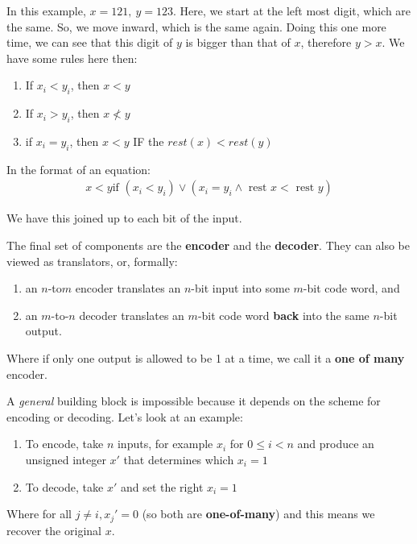 \documentclass[11pt,a4paper,titlepage,dvipsnames,cmyk]{scrartcl}
\begin{document}
In this example, $x = 121, \ y = 123$. Here, we start at the left most
digit, which are the same. So, we move inward, which is the same again.
Doing this one more time, we can see that this digit of $y$ is bigger than
that of $x$, therefore $y > x$. We have some rules here then:
\begin{enumerate}
    \item If $x_i < y_i$, then $x < y$
    \item If $x_i > y_i$, then $x \not < y$
    \item if $x_i = y_i$, then $x < y$ IF the $rest(x) < rest(y)$
\end{enumerate}

In the format of an equation:
\begin{align*}
    x<y \text{if } (x_i < y_i) \vee (x_i = y_i \wedge \text{ rest } x <
    \text{ rest } y)
\end{align*}

We have this joined up to each bit of the input.

The final set of components are the \textbf{encoder} and the
\textbf{decoder}. They can also be viewed as translators, or, formally:
\begin{enumerate}
    \item an $n$-to$m$ encoder translates an $n$-bit input into some
        $m$-bit code word, and
    \item an $m$-to-$n$ decoder translates an $m$-bit code word
        \textbf{back} into the same $n$-bit output.
\end{enumerate}

Where if only one output is allowed to be 1 at a time, we call it a
\textbf{one of many} encoder.

A \textit{general} building block is impossible because it depends on the
scheme for encoding or decoding. Let's look at an example:
\begin{enumerate}
    \item To encode, take $n$ inputs, for example $x_i$ for $0 \le i < n$
        and produce an unsigned integer $x'$ that determines which $x_i =
        1$
    \item To decode, take $x'$ and set the right $x_i = 1$
\end{enumerate}

Where for all $j \not = i, x_j' = 0$ (so both are \textbf{one-of-many})
and this means we recover the original $x$.
\end{document}
